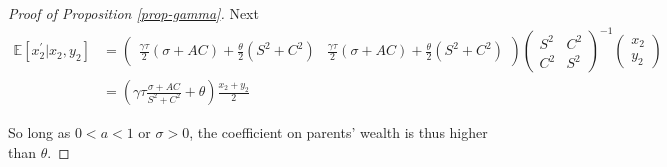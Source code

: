 \documentclass[
]{article}
\theoremstyle{definition}
\theoremstyle{definition}
\theoremstyle{definition}
\theoremstyle{definition}
\theoremstyle{remark}
\begin{document}
\begin{proof}[Proof of Proposition \ref{prop-gamma}]
Next
\begin{align*}
\mathbb{E}[x_{2}^{\prime}|x_{2},y_{2}] & =\left(\begin{array}{cc}
\frac{\gamma\tau}{2}(\sigma+AC)+\frac{\theta}{2}(S^{2}+C^{2}) & \frac{\gamma\tau}{2}(\sigma+AC)+\frac{\theta}{2}(S^{2}+C^{2})\end{array}\right)\left(\begin{array}{cc}
S^{2} & C^{2}\\
C^{2} & S^{2}
\end{array}\right)^{-1}\left(\begin{array}{c}
x_{2}\\
y_{2}
\end{array}\right)\\
 & =\left(\gamma\tau\frac{\sigma+AC}{S^{2}+C^{2}}+\theta\right)\frac{x_{2}+y_{2}}{2}
\end{align*}

So long as $0<a<1$ or $\sigma>0$, the coefficient on parents' wealth is thus 
higher than $\theta$.

\end{proof}
\end{document}
